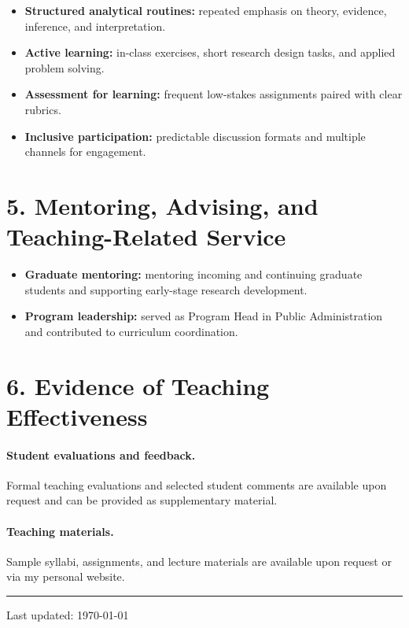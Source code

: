 \documentclass[letterpaper,11pt]{article}
\begin{document}
\begin{itemize}
  \item \textbf{Structured analytical routines:} repeated emphasis on theory, evidence, inference, and interpretation.
  \item \textbf{Active learning:} in-class exercises, short research design tasks, and applied problem solving.
  \item \textbf{Assessment for learning:} frequent low-stakes assignments paired with clear rubrics.
  \item \textbf{Inclusive participation:} predictable discussion formats and multiple channels for engagement.
\end{itemize}

\section*{5. Mentoring, Advising, and Teaching-Related Service}

\begin{itemize}
  \item \textbf{Graduate mentoring:} mentoring incoming and continuing graduate students and supporting early-stage research development.
  \item \textbf{Program leadership:} served as Program Head in Public Administration and contributed to curriculum coordination.
\end{itemize}

\section*{6. Evidence of Teaching Effectiveness}

\paragraph{Student evaluations and feedback.}
Formal teaching evaluations and selected student comments are available upon request and can be provided as supplementary material.

\paragraph{Teaching materials.}
Sample syllabi, assignments, and lecture materials are available upon request or via my personal website.

\vspace{0.5cm}
\noindent\rule[0.5ex]{\linewidth}{0.4pt}

{\small Last updated: \today}
\end{document}
